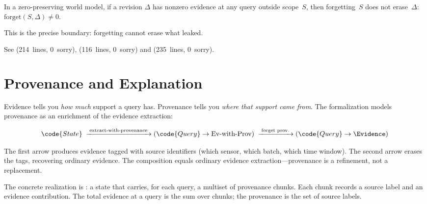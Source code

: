 \documentclass[11pt,openany]{report}
\begin{document}
\begin{theorem}
In a zero-preserving world model, if a revision $\Delta$ has nonzero
evidence at any query outside scope~$S$, then forgetting~$S$ does not
erase~$\Delta$: $\mathrm{forget}(S, \Delta) \neq 0$.
\end{theorem}

\noindent
This is the precise boundary: forgetting cannot erase what leaked.

See 
(214~lines, 0~sorry),
(116~lines, 0~sorry) and
(235~lines, 0~sorry).

\section{Provenance and Explanation}
\label{sec:provenance}

Evidence tells you \emph{how much} support a query has.  Provenance
tells you \emph{where that support came from}.  The formalization
models provenance as an enrichment of the evidence extraction:

\[
  \code{State}
  \;\xrightarrow{\;\text{extract-with-provenance}\;}
  (\code{Query} \to \text{Ev-with-Prov})
  \;\xrightarrow{\;\text{forget prov.}\;}
  (\code{Query} \to \Evidence)
\]

\noindent
The first arrow produces evidence tagged with source identifiers
(which sensor, which batch, which time window).  The second arrow
erases the tags, recovering ordinary evidence.  The composition
equals ordinary evidence extraction---provenance is a refinement,
not a replacement.

The concrete realization is : a state that
carries, for each query, a multiset of provenance chunks.  Each chunk
records a source label and an evidence contribution.  The total
evidence at a query is the sum over chunks; the provenance is the
set of source labels.

\end{document}
